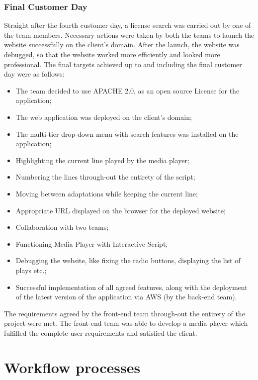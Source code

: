 \documentclass{l3proj}
\begin{document}
\subsubsection{Final Customer Day}
Straight after the fourth customer day, a license search was carried out by one of the team members. Necessary actions were taken by both the teams to launch the website successfully on the client’s domain. After the launch, the website was debugged, so that the website worked more efficiently and looked more professional. 
The final targets achieved up to and including the final customer day were as follows:
\begin{itemize}
\item The team decided to use APACHE 2.0, as an open source License for the application;
\item The web application was deployed on the client’s domain;
\item The multi-tier drop-down menu with search features was installed on the application;
\item  Highlighting the current line played by the media player;
\item Numbering the lines through-out the entirety of the script;
\item  Moving between adaptations while keeping the current line;
\item  Appropriate URL displayed on the browser for the deployed website;
\item Collaboration with two teams;
\item  Functioning Media Player with Interactive Script;
\item Debugging the website, like fixing the radio buttons, displaying the list of plays etc.;
\item Successful implementation of all agreed features, along with the deployment of the latest version of the application via AWS (by the back-end team). 
\end{itemize}

The requirements agreed by the front-end team through-out the entirety of the project were met. The front-end team was able to develop a media player which fulfilled the complete user requirements and satisfied the client. 
\fi

\section{Workflow processes}
\label{design}
\end{document}
